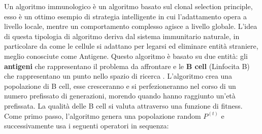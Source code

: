\documentclass[a4paper,12pt,titlepage,oneside]{article}
\begin{document}
Un algoritmo immunologico è un algoritmo basato sul clonal selection principle, esso è un ottimo esempio di strategia intelligente in cui l'adattamento opera a livello locale, mentre un comportamento complesso agisce a livello globale. L'idea di questa tipologia di algoritmo deriva dal sistema immunitario naturale, in particolare da come le cellule si adattano per legarsi ed eliminare
entità straniere, meglio conosciute come Antigene. Questo algoritmo è basato su due entità: gli \textbf{antigeni} che rappresentano il problema da affrontare e le \textbf{B cell} (Linfocita B) che rappresentano un punto nello spazio di ricerca \cite{Pavone}. L'algoritmo crea una popolazione di B cell, esse cresceranno e si perfezioneranno nel corso di un numero prefissato di generazioni, morendo quando hanno raggiunto un'età prefissata. La qualità delle B cell si valuta attraverso una funzione di fitness. Come primo passo, l'algoritmo genera una popolazione random $P^{(t)}$ e successivamente usa i seguenti operatori in sequenza:
\end{document}

